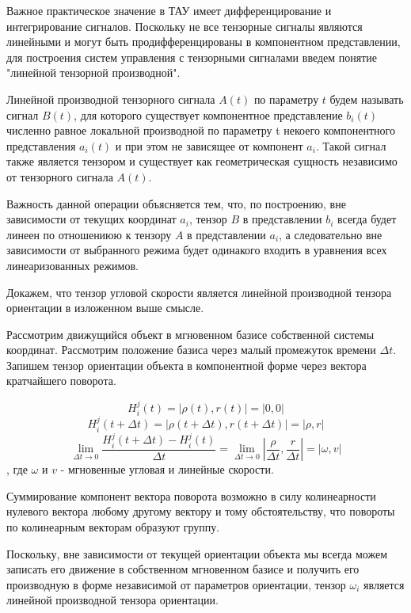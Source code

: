 \documentclass[a4paper]{article}
\begin{document}
Важное практическое значение в ТАУ имеет дифференцирование и интегрирование сигналов. Поскольку не все тензорные сигналы являются линейными и могут быть продифференцированы в компонентном представлении, для построения систем управления с тензорными сигналами введем понятие "линейной тензорной производной". 

Линейной производной тензорного сигнала $A(t)$ по параметру $t$ будем называть сигнал $B(t)$, для которого существует компонентное представление $b_i(t)$ численно равное локальной производной по параметру t некоего компонентного представления $a_i(t)$ и при этом не зависящее от компонент $a_i$. Такой сигнал также является тензором и существует как геометрическая сущность независимо от тензорного сигнала $A(t)$.

Важность данной операции объясняется тем, что, по построению, вне зависимости от текущих координат $a_i$, тензор $B$ в представлении $b_i$ всегда будет линеен по отношениюю к тензору $A$ в представлении $a_i$, а следовательно вне зависимости от выбранного режима будет одинакого входить в уравнения всех линеаризованных режимов.

Докажем, что тензор угловой скорости является линейной производной тензора ориентации в изложенном выше смысле.

Рассмотрим движущийся объект в мгновенном базисе собственной системы координат. Рассмотрим положение базиса через малый промежуток времени $\Delta t$. Запишем тензор ориентации объекта в компонентной форме через вектора кратчайшего поворота.

\begin{equation}H^j_i(t) = |\rho(t), r(t)| = |0, 0|\end{equation} 
\begin{equation}H^j_i(t+\Delta t) = |\rho(t + \Delta t), r(t + \Delta t)| = |\rho, r|\end{equation} 
\begin{equation}\lim_{\Delta t \to 0}\frac{H^j_i(t+\Delta t) - H^j_i(t)}{\Delta t} = \lim_{\Delta t \to 0}|\frac{\rho}{\Delta t}, \frac{r}{\Delta t}| = |\omega, v|\end{equation} , где $\omega$ и $v$ - мгновенные угловая и линейные скорости.

Суммирование компонент вектора поворота возможно в силу колинеарности нулевого вектора любому другому вектору и тому обстоятельству, что повороты по колинеарным векторам образуют группу.

Поскольку, вне зависимости от текущей ориентации объекта мы всегда можем записать его движение в собственном мгновенном базисе и получить его производную в форме независимой от параметров ориентации, тензор $\omega_i$ является линейной производной тензора ориентации.
\end{document}
